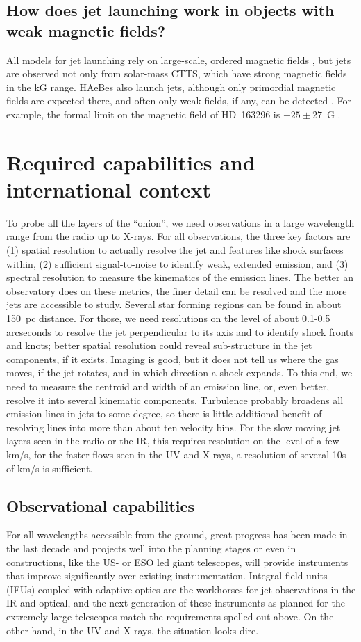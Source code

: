 \documentclass[12pt]{article}
\begin{document}
\subsection{How does jet launching work in objects with weak magnetic fields?}
All models for jet launching rely on large-scale, ordered magnetic fields \citep{2009ASSP...13...99F}, but jets are observed not only from solar-mass CTTS, which have strong magnetic fields in the kG range. HAeBes also launch jets, although only primordial magnetic fields are expected there, and often only weak fields, if any, can be detected \citep{2007A&A...463.1039H,2007MNRAS.376.1145W}. For example, the formal limit on the magnetic field of HD~163296 is $-25\pm 27$~G \citep{2007A&A...463.1039H}. 


\section{Required capabilities and international context}
To probe all the layers of the ``onion'', we need observations in a large
wavelength range from the radio up to X-rays. For all observations, the three
key factors are (1) spatial resolution to actually resolve the jet and features
like shock surfaces within, (2) sufficient signal-to-noise to identify weak, extended
emission, and (3) spectral resolution to measure the kinematics of the emission
lines. The better an observatory does on these metrics, the finer detail can be
resolved and the more jets are accessible to study. Several star forming
regions can be found in about 150~pc distance. For those, we need resolutions
on the level of about 0.1-0.5 arcseconds to resolve the jet perpendicular to
its axis and to identify shock fronts and knots; better spatial resolution
could reveal sub-structure in the jet components, if it exists. Imaging is
good, but it does not tell us where the gas moves, if the jet rotates, and in
which direction a shock expands. To this end, we need to measure the centroid and
width of an emission line, or, even better, resolve it into several kinematic
components. Turbulence probably broadens all emission lines in jets to some
degree, so there is little additional benefit of resolving lines into more than
about ten velocity bins. For the slow moving jet layers seen in the radio or the IR, this requires resolution on the level of a few km/s, for the faster flows seen in the UV and X-rays, a resolution of several 10s of km/s is sufficient.

\subsection{Observational capabilities}
For all wavelengths accessible from the ground, great progress has been made in the last decade and projects well into the planning stages or even in constructions, like the US- or ESO led giant telescopes, will provide instruments that improve significantly over existing instrumentation. Integral field units (IFUs) coupled with adaptive optics are the workhorses for jet observations in the IR and optical, and the next generation of these instruments as planned for the extremely large telescopes match the requirements spelled out above. On the other hand, in the UV and X-rays, the situation looks dire. 
\end{document}
